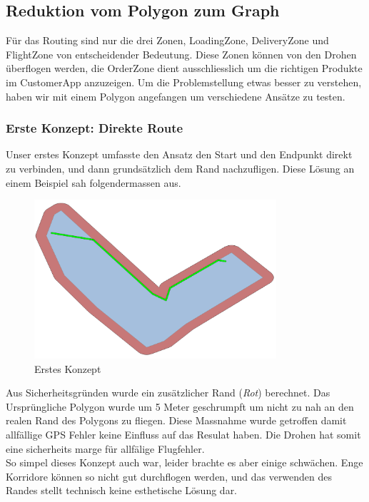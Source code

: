 \subsection{Reduktion vom Polygon zum Graph}
Für das Routing sind nur die drei Zonen, LoadingZone, DeliveryZone und FlightZone von entscheidender Bedeutung. Diese Zonen können von den Drohen überflogen werden, die OrderZone dient ausschliesslich um die richtigen Produkte im CustomerApp anzuzeigen. Um die Problemstellung etwas besser zu verstehen, haben wir mit einem Polygon angefangen um verschiedene Ansätze zu testen.
\subsubsection{Erste Konzept: Direkte Route}
Unser erstes Konzept umfasste den Ansatz den Start und den Endpunkt direkt zu verbinden, und dann grundsätzlich dem Rand nachzufligen. Diese Lösung an einem Beispiel sah folgendermassen aus.
\begin{figure}[h]
	\centering
	\includegraphics[width=0.8\textwidth]{images/routing/firstSolution.png}
	\caption{Erstes Konzept}
	\label{fig:first-concet-routing}
\end{figure}
Aus Sicherheitsgründen wurde ein zusätzlicher Rand (\textit{Rot}) berechnet. Das Ursprüngliche Polygon wurde um 5 Meter geschrumpft um nicht zu nah an den realen Rand des Polygons zu fliegen. Diese Massnahme wurde getroffen damit allfällige GPS Fehler keine Einfluss auf das Resulat haben. Die Drohen hat somit eine sicherheits marge für allfälige Flugfehler.
\\
So simpel dieses Konzept auch war, leider brachte es aber einige schwächen. Enge Korridore können so nicht gut durchflogen werden, und das verwenden des Randes stellt technisch keine esthetische Lösung dar.
\newpage
